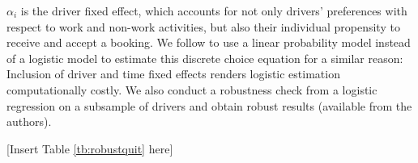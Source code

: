\documentclass[reviewmode]{restud}
\begin{document}
$\alpha_i$ is the driver fixed effect, which accounts for not only drivers' preferences with respect to work and non-work activities, but also their individual propensity to receive and accept a booking. %
We follow \citet{farber2015you} to use a linear probability model instead of a logistic model to estimate this discrete choice equation for a similar reason: Inclusion of driver and time fixed effects renders logistic estimation computationally costly. We also conduct a robustness check from a logistic regression on a subsample of drivers and obtain robust results (available from the authors).

\begin{center}
	[Insert Table \ref{tb:robustquit} here]
\end{center}
\end{document}
